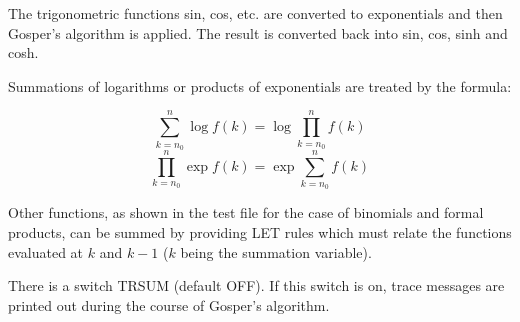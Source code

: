 The trigonometric functions sin, cos, etc. are converted to exponentials
and then Gosper's algorithm is applied.  The result is converted back into
sin, cos, sinh and cosh.

Summations of logarithms or products of exponentials are treated by the
formula:

\vspace{.1in}
\hspace*{2em} \[ \sum_{k=n_0}^{n} \log f(k) = \log \prod_{k=n_0}^n f(k) \]
\vspace{.1in}
\hspace*{2em} \[ \prod_{k=n_0}^n \exp f(k) = \exp \sum_{k=n_0}^n f(k) \]
\vspace{.1in}

Other functions, as shown in the test file for the case of binomials and
formal products, can be summed by providing LET rules which must relate
the functions evaluated at $k$ and $k - 1$ ($k$ being the summation variable).

There is a switch TRSUM (default OFF).  If this switch is on, trace
messages are printed out during the course of Gosper's algorithm.



